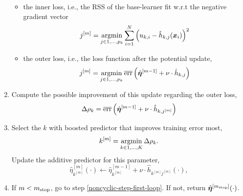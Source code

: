 \begin{algorithm}
\begin{enumerate}
\begin{itemize}
            \item the inner loss, i.e., the RSS of the base-learner fit w.r.t the negative gradient vector
                \begin{equation*}
                    j^{[m]}=\operatorname*{argmin}_{j\in 1,\ldots,p_k}\sum_{i=1}^N\left(u_{k,i}-\hat{h}_{k,j}(\bm{x}_i)\right)^2
                \end{equation*}
            \item the outer loss, i.e., the loss function after the potential update,
                \begin{equation*}
                    j^{[m]}=\operatorname*{argmin}_{j\in 1,\ldots,p_k}\overline{\text{err}}\left(\hat{\boldsymbol{\eta}}^{[m-1]} + \nu \cdot \hat{h}_{k,j} \right)
                \end{equation*}
        \end{itemize}
    \item
        Compute the possible improvement of this update regarding the outer loss,
        \begin{equation*}
            \Delta\rho_k=\overline{\text{err}}\left(\hat{\boldsymbol{\eta}}^{[m-1]} + \nu \cdot \hat{h}_{k,j^{[m]}} \right)
        \end{equation*}
    \item
        Select the $k$ with boosted predictor that improves training error most,
        \begin{equation*}
            k^{[m]}=\operatorname*{argmin}_{k\in1,\ldots,K}\Delta\rho_k.
        \end{equation*}
        Update the additive predictor for this parameter,
        \begin{equation*}
            \hat{\eta}^{[m]}_{k^{[m]}}\left(\cdot\right)\gets\hat{\eta}^{[m-1]}_{k^{[m]}}+\nu\cdot\hat{h}_{k^{[m]}j^{[m]}}\left(\cdot\right),
        \end{equation*}
    \item
        If $m<m_{\text{stop}}$, go to step \ref{noncyclic-step-first-loop}. If not, return $\hat{\boldsymbol{\eta}}^{[m_{\text{stop}}]}(\cdot)$.
\end{enumerate}
\end{algorithm}


